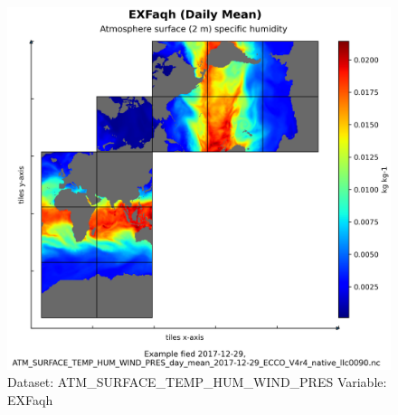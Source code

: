 \begin{figure}[H]
\centering
\includegraphics[scale=0.55]{../images/plots/native_plots/Atmosphere_Surface_Temperature_Humidity_Wind_and_Pressure/EXFaqh.png}
\caption{Dataset: ATM\_SURFACE\_TEMP\_HUM\_WIND\_PRES Variable: EXFaqh}
\label{tab:table-ATM_SURFACE_TEMP_HUM_WIND_PRES_EXFaqh-Plot}
\end{figure}
\pagebreak
